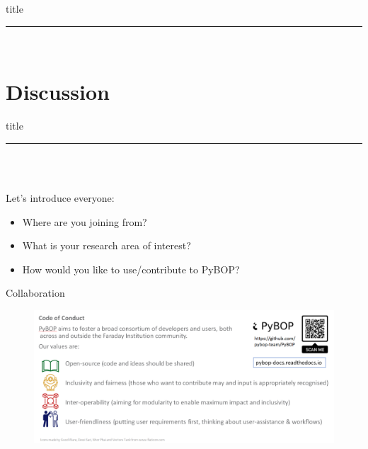 \documentclass[aspectratio=169]{beamer} %
\begin{document}
\begin{frame}[plain]
    \centering
    \begin{beamercolorbox}[sep=8pt,center,shadow=true,rounded=true]{title}
    \par%
    \color{oxfordblue}\noindent\rule{10cm}{1pt} \\
    \end{beamercolorbox}
\end{frame}


\section{Discussion}

\begin{frame}[plain]
    \centering
    \begin{beamercolorbox}[sep=8pt,center,shadow=true,rounded=true]{title}
    \par%
    \color{oxfordblue}\noindent\rule{10cm}{1pt} \\
    \LARGE{\faUserPlus} \\
    \vspace{6mm} \normalsize
    \begin{flushleft}
        Let's introduce everyone:
    \end{flushleft}
    \begin{itemize}
        \item Where are you joining from?
        \item What is your research area of interest?
        \item How would you like to use/contribute to PyBOP?
    \end{itemize}
    \end{beamercolorbox}
\end{frame}

\begin{frame}{Collaboration}
    \vspace{-6mm}
    \begin{figure}
        \centering
        \includegraphics[width=\textwidth]{Images/Code_of_Conduct.png}
    \end{figure}
\end{frame}
\end{document}

